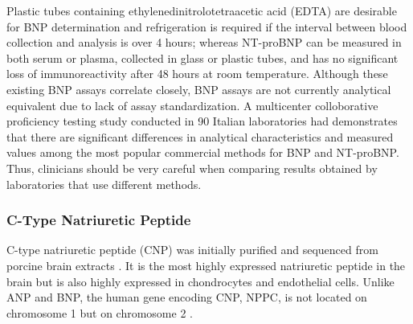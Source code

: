\documentclass[14pt,a4paper,onecolumn]{extarticle}
\begin{document}
Plastic tubes containing ethylenedinitrolotetraacetic acid (EDTA) are desirable for BNP determination and refrigeration is required if the interval between blood collection and analysis is over 4 hours; whereas NT-proBNP can be measured in both serum or plasma, collected in glass or plastic tubes, and has no significant loss of immunoreactivity after 48 hours at room temperature. Although these existing BNP assays correlate closely, BNP assays are not currently analytical equivalent due to lack of assay standardization.\citep{Omland2008}  A multicenter colloborative proficiency testing study conducted in 90 Italian laboratories had demonstrates that there are significant differences in analytical characteristics and measured values among the most popular commercial methods for BNP and NT-proBNP. Thus, clinicians should be very careful when comparing results obtained by laboratories that use different methods.\citep{Prontera2009}


\subsubsection{C-Type Natriuretic Peptide}
C-type natriuretic peptide (CNP) was initially purified and sequenced from porcine brain extracts \citep{Sudoh1990}. It is the most highly expressed natriuretic peptide in the brain but is also highly expressed in chondrocytes and endothelial cells. Unlike ANP and BNP, the human gene encoding CNP, NPPC, is not located on chromosome 1 but on chromosome 2 \citep{Ogawa1994b}.
\end{document}
